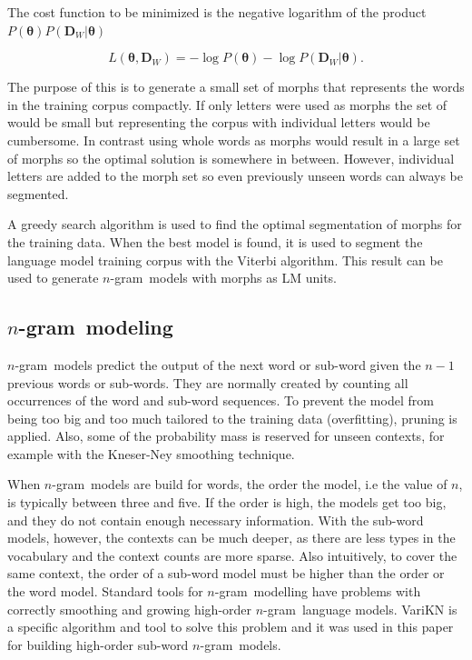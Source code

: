 \documentclass[b5paper]{article}
\newcommand{\ngram}{$n$-gram}
\begin{document}
The cost function to be minimized is the negative logarithm of the product  $P(\bm{\theta})P(\bm{D}_W|\bm{\theta})$

\begin{equation}
L(\bm{\theta}, \bm{D}_W)=-\log P(\bm{\theta})-\log P(\bm{D}_W|\bm{\theta}).
\end{equation}

The purpose of this is to generate a small set of morphs that represents the words in the training corpus compactly. If only letters were used as morphs the set of would be small but representing the corpus with individual letters would be cumbersome. In contrast using whole words as morphs would result in a large set of morphs so the optimal solution is somewhere in between. However, individual letters are added to the morph set so even previously unseen words can always be segmented.

A greedy search algorithm is used to find the optimal segmentation of morphs for the training data.  When the best model is found, it is used to segment the language model training corpus with the Viterbi algorithm. This result can be used to generate \ngram\ models with morphs as LM units.



\subsection{\ngram\ modeling}

\ngram\ models predict the output of the next word or sub-word given the $n-1$ previous words or sub-words. They are normally created by counting all occurrences of the word and sub-word sequences. To prevent the model from being too big and too much tailored to the training data (overfitting), pruning is applied. Also, some of the probability mass is reserved for unseen contexts, for example with the Kneser-Ney smoothing technique\cite{chen1996empirical}.

When \ngram\ models are build for words, the order the model, i.e the value of $n$, is typically between three and five. If the order is high, the models get too big, and they do not contain enough necessary information. With the sub-word models, however, the contexts can be much deeper, as there are less types in the vocabulary and the context counts are more sparse. Also intuitively, to cover the same context, the order of a sub-word model must be higher than the order or the word model.
Standard tools for \ngram\ modelling have problems with correctly smoothing and growing high-order \ngram\ language models.  VariKN  \cite{siivola2007growing} is a specific algorithm and tool to solve this problem and it was used in this paper for building high-order sub-word  \ngram\ models. 
\end{document}
